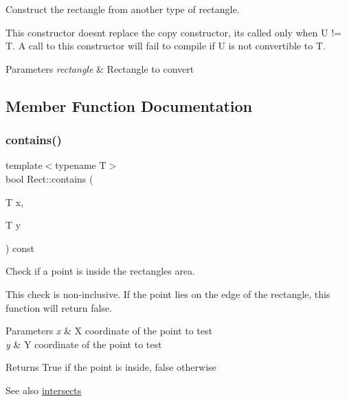 Construct the rectangle from another type of rectangle. 

This constructor doesn\textquotesingle{}t replace the copy constructor, it\textquotesingle{}s called only when U != T. A call to this constructor will fail to compile if U is not convertible to T.


\begin{DoxyParams}{Parameters}
{\em rectangle} & Rectangle to convert \\
\hline
\end{DoxyParams}


\subsection{Member Function Documentation}
\mbox{\label{classsf_1_1_rect_a1d8a4a3aecec18310f6e3e23db43dfb8}} 
\subsubsection{\texorpdfstring{contains()}{contains()}\hspace{0.1cm}{\footnotesize\ttfamily [1/2]}}
{\footnotesize\ttfamily template$<$typename T$>$ \\
bool Rect\+::contains (\begin{DoxyParamCaption}\item[{T}]{x,  }\item[{T}]{y }\end{DoxyParamCaption}) const}



Check if a point is inside the rectangle\textquotesingle{}s area. 

This check is non-\/inclusive. If the point lies on the edge of the rectangle, this function will return false.


\begin{DoxyParams}{Parameters}
{\em x} & X coordinate of the point to test \\
\hline
{\em y} & Y coordinate of the point to test\\
\hline
\end{DoxyParams}
\begin{DoxyReturn}{Returns}
True if the point is inside, false otherwise
\end{DoxyReturn}
\begin{DoxySeeAlso}{See also}
\hyperlink{classsf_1_1_rect_ad90321b1135cad31589f2db2f9b772db}{intersects} 
\end{DoxySeeAlso}
\mbox{\label{classsf_1_1_rect_aa254e12d95ecf460ace8b2784fbab5eb}} 
